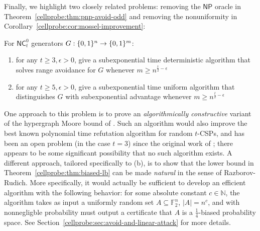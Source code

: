 Finally, we highlight two closely related problems: removing the $\mathsf{NP}$ oracle in Theorem~\ref{cellprobe:thm:pnp-avoid-odd} and removing the nonuniformity in Corollary~\ref{cellprobe:cor:mossel-improvement}:
\begin{problem}
For $\mathsf{NC}^0_t$ generators $G:\{0,1\}^n \to \{0,1\}^m$:
\begin{enumerate}
    \item[(a)] for any $t\geq 3, \epsilon>0$, give a subexponential time deterministic algorithm that solves range avoidance for $G$ whenever $m \geq n^{\frac{t}{2} - \epsilon}$
    \item[(b)] for any $t \geq 5, \epsilon>0$, give a subexponential time uniform algorithm that distinguishes $G$ with subexponential advantage whenever $m \geq n^{\frac{t}{2}-\epsilon}$
\end{enumerate}
\end{problem}
One approach to this problem is to prove an \emph{algorithmically constructive} variant of the hypergraph Moore bound of \cite{smoothed,simpler-moore}. 
Such an algorithm would also improve the best known polynomial time refutation algorithm for random $t$-CSPs, and has been an open problem (in the case $t=3$) since the original work of \cite{FKO}; there appears to be some significant possibility that no such algorithm exists.
A different approach, tailored specifically to (b), is to show that the lower bound in Theorem~\ref{cellprobe:thm:biased-lb} can be made \emph{natural} in the sense of Razborov-Rudich. More specifically, it would actually be sufficient to develop an efficient algorithm with the following behavior: for some absolute constant $c \in\mathbb{N}$, the algorithm takes as input a uniformly random set $A \subseteq \mathbb{F}_2^n$, $|A|= n^c$, and with nonnegligble probability must output a certificate that $A$ is a $\frac{1}{4}$-biased probability space. See Section~\ref{cellprobe:sec:avoid-and-linear-attack} for more details.

